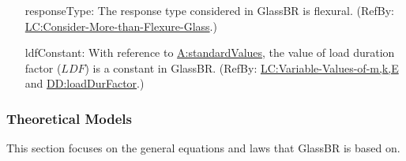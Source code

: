 \documentclass[12pt]{article}
\begin{document}
\begin{itemize}
\item[responseType:\phantomsection\label{assumpRT}]{The response type considered in GlassBR is flexural. (RefBy: \hyperref[considerMoreThanFlexGlass]{LC:Consider-More-than-Flexure-Glass}.)}
\item[ldfConstant:\phantomsection\label{assumpLDFC}]{With reference to \hyperref[assumpSV]{A:standardValues}, the value of load duration factor ($\mathit{LDF}$) is a constant in GlassBR. (RefBy: \hyperref[varValsOfmkE]{LC:Variable-Values-of-m,k,E} and \hyperref[DD:loadDurFactor]{DD:loadDurFactor}.)}
\end{itemize}
\subsubsection{Theoretical Models}
\label{Sec:TMs}
This section focuses on the general equations and laws that GlassBR is based on.
\end{document}

